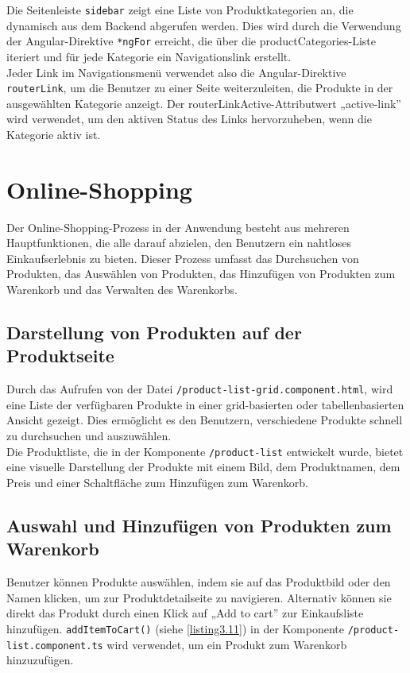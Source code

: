 Die Seitenleiste \verb*|sidebar| zeigt eine Liste von Produktkategorien an, die dynamisch aus dem Backend abgerufen werden. Dies wird durch die Verwendung der Angular-Direktive \verb*|*ngFor| erreicht, die über die productCategories-Liste iteriert und für jede Kategorie ein Navigationslink erstellt.\\
Jeder Link im Navigationsmenü verwendet also die Angular-Direktive \verb*|routerLink|, um die Benutzer zu einer Seite weiterzuleiten, die Produkte in der ausgewählten Kategorie anzeigt. Der routerLinkActive-Attributwert „active-link'' wird verwendet, um den aktiven Status des Links hervorzuheben, wenn die Kategorie aktiv ist.


\section{Online-Shopping}

Der Online-Shopping-Prozess in der Anwendung besteht aus mehreren Hauptfunktionen, die alle darauf abzielen, den Benutzern ein nahtloses Einkaufserlebnis zu bieten. Dieser Prozess umfasst das Durchsuchen von Produkten, das Auswählen von Produkten, das Hinzufügen von Produkten zum Warenkorb und das Verwalten des Warenkorbs.

\subsection{Darstellung von Produkten auf der Produktseite}

Durch das Aufrufen von der Datei \verb*|/product-list-grid.component.html|, wird eine Liste der verfügbaren Produkte in einer grid-basierten oder tabellenbasierten Ansicht gezeigt. Dies ermöglicht es den Benutzern, verschiedene Produkte schnell zu durchsuchen und auszuwählen. \\
Die Produktliste, die in der Komponente \verb*|/product-list| entwickelt wurde, bietet eine visuelle Darstellung der Produkte mit einem Bild, dem Produktnamen, dem Preis und einer Schaltfläche zum Hinzufügen zum Warenkorb.

\subsection{Auswahl und Hinzufügen von Produkten zum Warenkorb}

Benutzer können Produkte auswählen, indem sie auf das Produktbild oder den Namen klicken, um zur Produktdetailseite zu navigieren. Alternativ können sie direkt das Produkt durch einen Klick auf „Add to cart'' zur Einkaufsliste hinzufügen. \verb*|addItemToCart()| (siehe \ref{listing3.11}) in der Komponente \verb*|/product-list.component.ts| wird verwendet, um ein Produkt zum Warenkorb hinzuzufügen.

